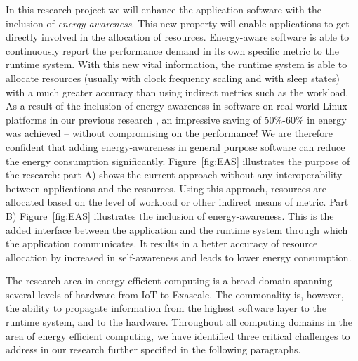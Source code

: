 \documentclass{article}
\begin{document}
In this research project we will enhance the application software with the inclusion of \textit{energy-awareness}.
This new property will enable applications to get directly involved in the allocation of resources.
Energy-aware software is able to continuously report the performance demand in its own specific metric to the runtime system.
With this new vital information, the runtime system is able to allocate resources (usually with clock frequency scaling and with sleep states) with a much greater accuracy than using indirect metrics such as the workload.
As a result of the inclusion of energy-awareness in software on real-world Linux platforms in our previous research \cite{Holmbacka:15}, an impressive saving of 50\%-60\% in energy was achieved -- 
without compromising on the performance!
We are therefore confident that adding energy-awareness in general purpose software can reduce the energy consumption significantly.
Figure~\ref{fig:EAS} illustrates the purpose of the research: part A) shows the current approach without any interoperability between applications and the resources.
Using this approach, resources are allocated based on the level of workload or other indirect means of metric.
Part B) Figure~\ref{fig:EAS} illustrates the inclusion of energy-awareness. 
This is the added interface between the application and the runtime system through which the application communicates.
It results in a better accuracy of resource allocation by increased in self-awareness and leads to lower energy consumption.\smallskip

The research area in energy efficient computing is a broad domain spanning several levels of hardware from IoT to Exascale.
The commonality is, however, the ability to propagate information from the highest software layer to the runtime system, and to the hardware.
Throughout all computing domains in the area of energy efficient computing, we have identified three critical challenges to address in our research further specified in the following paragraphs.
\end{document}
